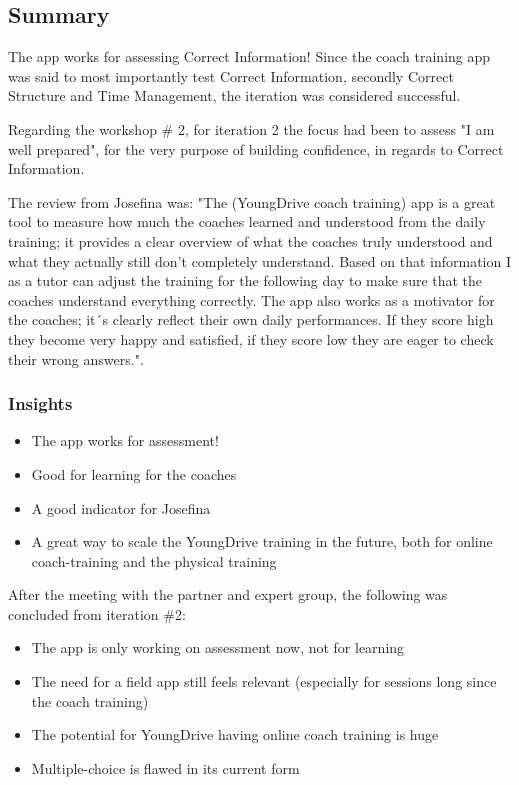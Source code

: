 \subsection{Summary}

The app works for assessing Correct Information! Since the coach training app was said to most importantly test Correct Information, secondly Correct Structure and Time Management, the iteration was considered successful.

Regarding the workshop \# 2, for iteration 2 the focus had been to assess "I am well prepared", for the very purpose of building confidence, in regards to Correct Information.

The review from Josefina was: "The (YoungDrive coach training) app is a great tool to measure how much the coaches learned and understood from the daily training; it provides a clear overview of what the coaches truly understood and what they actually still don’t completely understand. Based on that information I as a tutor can adjust the training for the following day to make sure that the coaches understand everything correctly. The app also works as a motivator for the coaches; it´s clearly reflect their own daily performances. If they score high they become very happy and satisfied, if they score low they are eager to check their wrong answers.".

\subsubsection{Insights}

  \begin{itemize}
    \item The app works for assessment!
    \item Good for learning for the coaches
    \item A good indicator for Josefina
    \item A great way to scale the YoungDrive training in the future, both for online coach-training and the physical training
  \end{itemize}

After the meeting with the partner and expert group, the following was concluded from iteration \#2:

\begin{itemize}
\item The app is only working on assessment now, not for learning
\item The need for a field app still feels relevant (especially for sessions long since the coach training)
\item The potential for YoungDrive having online coach training is huge
\item Multiple-choice is flawed in its current form
\end{itemize}

